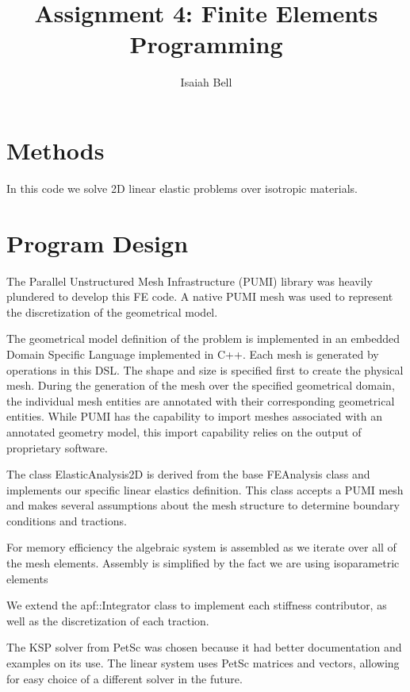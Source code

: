 \documentclass{article}
\begin{document}
\title{Assignment 4: Finite Elements Programming}
\author{Isaiah Bell} 
\maketitle

\section{Methods}

In this code we solve 2D linear elastic problems over isotropic materials.


\section{Program Design}

The Parallel Unstructured Mesh Infrastructure (PUMI) library was heavily plundered to develop this FE code. A native PUMI mesh was used to represent the discretization of the geometrical model. 

The geometrical model definition of the problem is implemented in an embedded Domain Specific Language implemented in C++. Each mesh is generated by operations in this DSL. The shape and size is specified first to create the physical mesh. During the generation of the mesh over the specified geometrical domain, the individual mesh entities are annotated with their corresponding geometrical entities. While PUMI has the capability to import meshes associated with an annotated geometry model, this import capability relies on the output of proprietary software. 

The class ElasticAnalysis2D is derived from the base FEAnalysis class and implements
our specific linear elastics definition. This class accepts a PUMI mesh and makes
several assumptions about the mesh structure to determine boundary conditions and
tractions.

For memory efficiency the algebraic system is assembled as we iterate over all of the
mesh elements. Assembly is simplified by the fact we are using isoparametric elements

We extend the apf::Integrator class to implement each stiffness contributor, as well as the discretization of each traction.


The KSP solver from PetSc was chosen because it had better documentation and examples on its use. The linear system uses PetSc matrices and vectors, allowing for easy choice of a different solver in the future.
\end{document}
